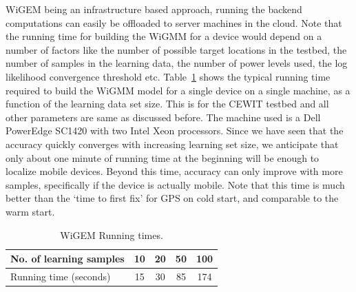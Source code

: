 WiGEM being an infrastructure based approach, running the backend computations can easily be offloaded to server machines in the cloud.  Note that the running time for building the WiGMM for a device would depend on a number of factors like the number of possible target locations in the testbed, the number of samples in the learning data, the number of power levels used, the log likelihood convergence threshold etc. Table~\ref{table:runningtime} shows the typical running time required to build the WiGMM model for a single device on a single machine, as a function of the learning data set size. This is for the CEWIT testbed and all other parameters are same as discussed before. The machine used is a Dell PowerEdge SC1420 with two Intel Xeon processors. 
Since we have seen that the accuracy quickly converges with increasing learning set size, we
anticipate that only about one minute of running time at the beginning will be enough to 
localize mobile devices. Beyond this time, accuracy can only improve with more samples, specifically 
if the device is actually mobile. Note that this time is much better than the `time to first fix' for GPS on
cold start, and comparable to the warm start. 

\begin{table}[h!]
\begin{center}
\begin{tabular}{|l|c|c|c|c|}
   \hline
   No. of learning samples & 10 & 20 & 50 & 100 \\ \hline
   Running time (seconds) & 15 & 30 & 85 & 174
    \\
   \hline
\end{tabular}
	\caption{WiGEM Running times.}
   \label{table:runningtime}
\end{center}
\vspace{-0.3in}
\end{table}


  